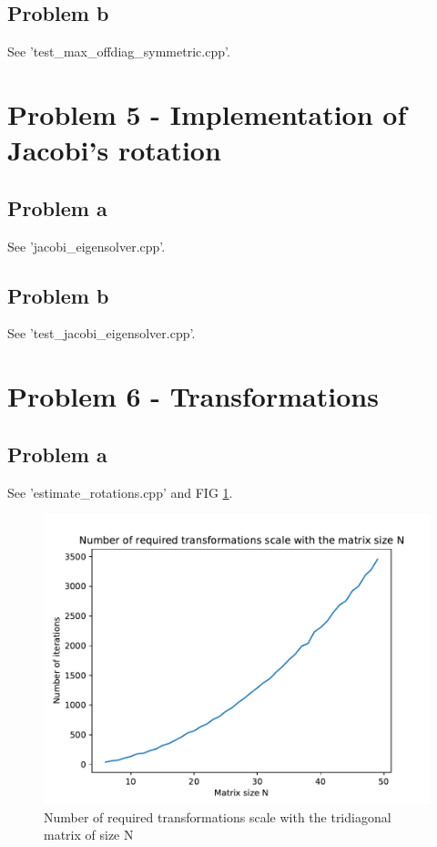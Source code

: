 \documentclass[english,notitlepage]{revtex4-1}  %
\begin{document}
\subsection*{Problem b}
See 'test\_max\_offdiag\_symmetric.cpp'.

\section*{Problem 5 - Implementation of Jacobi’s rotation }

\subsection*{Problem a}
See 'jacobi\_eigensolver.cpp'.

\subsection*{Problem b}
See 'test\_jacobi\_eigensolver.cpp'.

\section*{Problem 6 - Transformations}

\subsection*{Problem a}
See 'estimate\_rotations.cpp' and FIG \ref{transformations}.

\begin{figure}[H]
	\centering
	\includegraphics[scale=0.55]{plots/transformations.pdf} %
	\caption{Number of required transformations scale with the tridiagonal matrix of size N}
	\label{transformations}
\end{figure}
\end{document}
